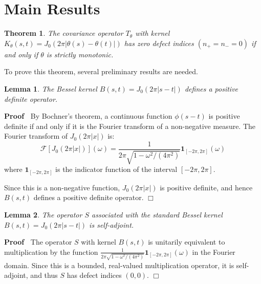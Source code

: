 \documentclass{article}
\newenvironment{proof}{\noindent\textbf{Proof\ }}{\hspace*{\fill}$\Box$\medskip}
\newtheorem{lemma}{Lemma}
\newtheorem{theorem}{Theorem}
\begin{document}
\section{Main Results}

\begin{theorem}
  \label{thm:main}The covariance operator $T_{\theta}$ with kernel $K_{\theta}
  (s, t) = J_0  (2 \pi | \theta (s) - \theta (t) |)$ has zero defect indices
  $(n_+ = n_- = 0)$ if and only if $\theta$ is strictly monotonic.
\end{theorem}

To prove this theorem, several preliminary results are needed.

\begin{lemma}
  \label{lemma:bessel-pd}The Bessel kernel $B (s, t) = J_0  (2 \pi |s - t|)$
  defines a positive definite operator.
\end{lemma}

\begin{proof}
  By Bochner's theorem, a continuous function $\phi (s - t)$ is positive
  definite if and only if it is the Fourier transform of a non-negative
  measure. The Fourier transform of $J_0  (2 \pi |x|)$ is:
  \begin{equation}
    \mathcal{F} [J_0 (2 \pi |x|)] (\omega) = \frac{1}{2 \pi \sqrt{1 - \omega^2
    / (4 \pi^2)}}  \textbf{1}_{[- 2 \pi, 2 \pi]} (\omega)
  \end{equation}
  where $\textbf{1}_{[- 2 \pi, 2 \pi]}$ is the indicator function of the
  interval $[- 2 \pi, 2 \pi]$.
  
  Since this is a non-negative function, $J_0  (2 \pi |x|)$ is positive
  definite, and hence $B (s, t)$ defines a positive definite operator.
\end{proof}

\begin{lemma}
  \label{lemma:standard-sa}The operator $S$ associated with the standard
  Bessel kernel $B (s, t) = J_0  (2 \pi |s - t|)$ is self-adjoint.
\end{lemma}

\begin{proof}
  The operator $S$ with kernel $B (s, t)$ is unitarily equivalent to
  multiplication by the function $\frac{1}{2 \pi \sqrt{1 - \omega^2 / (4
  \pi^2)}}  \textbf{1}_{[- 2 \pi, 2 \pi]} (\omega)$ in the Fourier domain.
  Since this is a bounded, real-valued multiplication operator, it is
  self-adjoint, and thus $S$ has defect indices $(0, 0)$.
\end{proof}
\end{document}
